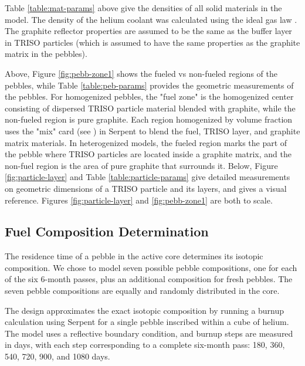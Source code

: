 

Table \ref{table:mat-params} above give the densities of all solid materials in the model.  The density of the helium coolant was calculated using the ideal gas law \cite{levine_derivation_nodate}.  The graphite reflector properties are assumed to be the same as the buffer layer in TRISO particles (which is assumed to have the same properties as the graphite matrix in the pebbles).



Above, Figure \ref{fig:pebb-zone1} shows the fueled vs non-fueled regions of the pebbles, while Table \ref{table:peb-params} provides the geometric measurements of the pebbles.  For homogenized pebbles, the "fuel zone" is the homogenized center consisting of dispersed TRISO particle material blended with graphite, while the non-fueled region is pure graphite.  Each region homogenized by volume fraction uses the "mix" card (see \cite{leppanenjaakko_serpent_2015}) in Serpent to blend the fuel, TRISO layer, and graphite matrix materials.  In heterogenized models, the fueled region marks the part of the pebble where TRISO particles are located inside a graphite matrix, and the non-fuel region is the area of pure graphite that surrounds it.  Below, Figure \ref{fig:particle-layer} and Table \ref{table:particle-params} give detailed measurements on geometric dimensions of a TRISO particle and its layers, and gives a visual reference.  Figures \ref{fig:particle-layer} and \ref{fig:pebb-zone1} are both to scale.



\subsection{Fuel Composition Determination}
\label{meth-comp}

The residence time of a pebble in the active core determines its isotopic composition.  We chose to model seven possible pebble compositions, one for each of the six 6-month passes, plus an additional composition for fresh pebbles.  The seven pebble compositions are equally and randomly distributed in the core.

The design approximates the exact isotopic composition by running a burnup calculation using Serpent for a single pebble inscribed within a cube of helium.  The model uses a reflective boundary condition, and burnup steps are measured in days, with each step corresponding to a complete six-month pass: 180, 360, 540, 720, 900, and 1080 days.

